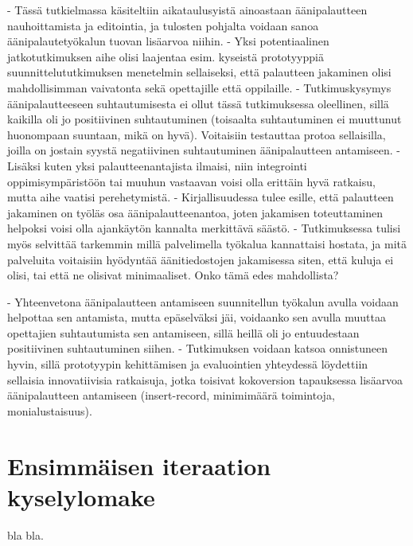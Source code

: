 \documentclass[utf8]{gradu3}
\begin{document}
- Tässä tutkielmassa käsiteltiin aikataulusyistä ainoastaan äänipalautteen nauhoittamista ja editointia, ja tulosten pohjalta voidaan sanoa äänipalautetyökalun tuovan lisäarvoa niihin.
- Yksi potentiaalinen jatkotutkimuksen aihe olisi laajentaa esim. kyseistä prototyyppiä suunnittelututkimuksen menetelmin sellaiseksi, että palautteen jakaminen olisi mahdollisimman vaivatonta sekä opettajille että oppilaille.
- Tutkimuskysymys äänipalautteeseen suhtautumisesta ei ollut tässä tutkimuksessa oleellinen, sillä kaikilla oli jo positiivinen suhtautuminen (toisaalta suhtautuminen ei muuttunut huonompaan suuntaan, mikä on hyvä). Voitaisiin testauttaa protoa sellaisilla, joilla on jostain syystä negatiivinen suhtautuminen äänipalautteen antamiseen.
- Lisäksi kuten yksi palautteenantajista ilmaisi, niin integrointi oppimisympäristöön tai muuhun vastaavan voisi olla erittäin hyvä ratkaisu, mutta aihe vaatisi perehetymistä.
- Kirjallisuudessa tulee esille, että palautteen jakaminen on työläs osa äänipalautteenantoa, joten jakamisen toteuttaminen helpoksi voisi olla ajankäytön kannalta merkittävä säästö.
- Tutkimuksessa tulisi myös selvittää tarkemmin millä palvelimella työkalua kannattaisi hostata, ja mitä palveluita voitaisiin hyödyntää äänitiedostojen jakamisessa siten, että kuluja ei olisi, tai että ne olisivat minimaaliset. Onko tämä edes mahdollista?

- Yhteenvetona äänipalautteen antamiseen suunnitellun työkalun avulla voidaan helpottaa sen antamista, mutta epäselväksi jäi, voidaanko sen avulla muuttaa opettajien suhtautumista sen antamiseen, sillä heillä oli jo entuudestaan positiivinen suhtautuminen siihen.
- Tutkimuksen voidaan katsoa onnistuneen hyvin, sillä prototyypin kehittämisen ja evaluointien yhteydessä löydettiin sellaisia innovatiivisia ratkaisuja, jotka toisivat kokoversion tapauksessa lisäarvoa äänipalautteen antamiseen (insert-record, minimimäärä toimintoja, monialustaisuus).

%

\printbibliography

\appendix
\section{Ensimmäisen iteraation kyselylomake}

bla bla.
\end{document}

